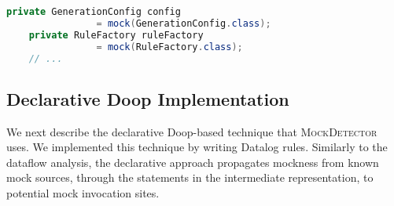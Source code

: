     

\begin{lstlisting}[basicstyle=\ttfamily, caption={Example for field mocks defined by field initializations from \texttt{TypeRuleTest.java} in jsonschema2pojo.},
basicstyle=\scriptsize\ttfamily,language = Java, framesep=4.5mm,
framexleftmargin=1mm, captionpos=b, label=lis:fieldMock]
    private GenerationConfig config
                = mock(GenerationConfig.class);
    private RuleFactory ruleFactory
                = mock(RuleFactory.class);
    // ...
\end{lstlisting}

    

\subsection{Declarative Doop Implementation}
\label{sec:dec-doop}
We next describe the declarative Doop-based technique that \textsc{MockDetector} uses. We implemented this technique by writing Datalog rules. Similarly to the dataflow analysis, the declarative approach propagates mockness from known mock sources, through the statements in the intermediate representation, to potential mock invocation sites.

